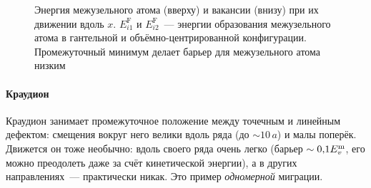 \begin{figure}[ht]
\centering
{}
\caption{Энергия межузельного атома (вверху) и вакансии (внизу) при их
движении вдоль $x$. $E^{\mathrm F}_{i1}$ и $E^{\mathrm F}_{i2}$~—
энергии образования межузельного атома в гантельной и
объёмно-центрированной конфигурации. Промежуточный минимум делает барьер
для межузельного атома низким}
\label{fig:int-profile}
\end{figure}

\paragraph{Краудион}
Краудион занимает промежуточное положение между точечным и линейным
дефектом: смещения вокруг него велики вдоль ряда (до $\sim10\,a$) и малы
поперёк. Движется он тоже необычно: вдоль своего ряда очень легко
(барьер $\sim0{,}1E_{v}^{\mathrm{m}}$, его можно преодолеть даже за счёт кинетической
энергии), а в других направлениях~— практически никак. Это пример
\emph{одномерной} миграции.

